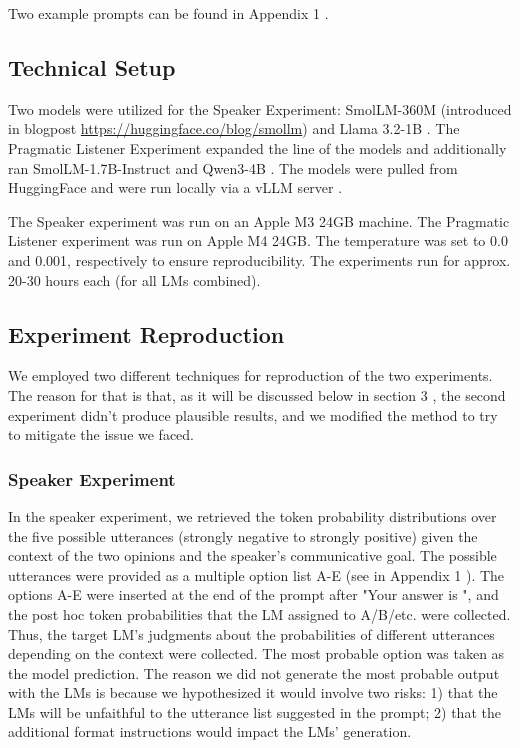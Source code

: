 \documentclass[11pt]{article}
\begin{document}
Two example prompts can be found in Appendix 1 .


\subsection{Technical Setup}
\label{sec:setup}

Two models were utilized for the Speaker Experiment: SmolLM-360M (introduced in blogpost \url{https://huggingface.co/blog/smollm}) and Llama 3.2-1B \citep{grattafiori-2024}. The Pragmatic Listener Experiment expanded the line of the models and additionally ran SmolLM-1.7B-Instruct and Qwen3-4B \citep{yang-2025}. The models were pulled from HuggingFace and were run locally via a vLLM server \citep{kwon-2023}. 

The Speaker experiment was run on an Apple M3 24GB machine. The Pragmatic Listener experiment was run on Apple M4 24GB. The temperature was set to 0.0 and 0.001, respectively to ensure reproducibility. The experiments run for approx. 20-30 hours each (for all LMs combined).


\subsection{Experiment Reproduction}
\label{sec:repr}

We employed two different techniques for reproduction of the two experiments. The reason for that is that, as it will be discussed below in section 3 , the second experiment didn't produce plausible results, and we modified the method to try to mitigate the issue we faced.

\subsubsection{Speaker Experiment}
\label{sec:exp2}

In the speaker experiment, we retrieved the token probability distributions over the five possible utterances (strongly negative to strongly positive) given the context of the two opinions and the speaker's communicative goal. The possible utterances were provided as a multiple option list A-E (see in Appendix 1 ). The options A-E were inserted at the end of the prompt after "Your answer is ", and the post hoc token probabilities that the LM assigned to A/B/etc. were collected. Thus, the target LM's judgments about the probabilities of different utterances depending on the context were collected. The most probable option was taken as the model prediction. The reason we did not generate the most probable output with the LMs is because we hypothesized it would involve two risks: 1) that the LMs will be unfaithful to the utterance list suggested in the prompt; 2) that the additional format instructions would impact the LMs' generation.
\end{document}
